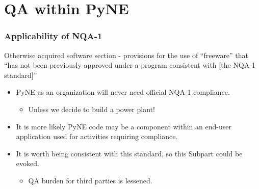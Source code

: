 \documentclass[12pt]{beamer}
\begin{document}
\section{QA within PyNE}
%
%
%
%
\begin{frame}
\frametitle{Applicability of NQA-1}


\alert{Otherwise acquired software} section - provisions for the use of
``freeware'' that ``has not been previously approved under a program consistent
with [the NQA-1 standard]''

\begin{itemize}
\item{PyNE as an organization will never need official NQA-1 compliance.}
    \begin{itemize}
    \item{Unless we decide to build a power plant!}
    \end{itemize}
\item{It is more likely PyNE code may be a component within an end-user application used for activities requiring compliance.}
\item{It is worth being consistent with this standard, so this Subpart could be evoked.}
    \begin{itemize}
    \item{QA burden for third parties is lessened.}
    \end{itemize}
\end{itemize}

\end{frame}
\end{document}

